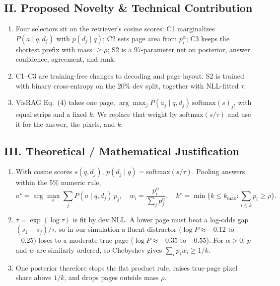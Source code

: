 \documentclass[8pt,a4paper]{article}
\begin{document}
\subsection*{II. Proposed Novelty \& Technical Contribution}
\begin{enumerate}
    \item Four selectors sit on the retriever's cosine scores: C1 marginalizes $P(a\mid q,d_j)$ with $p(d_j\mid q)$; C2 sets page area from $p_i^{\alpha}$; C3 keeps the shortest prefix with mass $\ge\rho$; S2 is a 97-parameter net on posterior, answer confidence, agreement, and rank.
    \item C1--C3 are training-free changes to decoding and page layout. S2 is trained with binary cross-entropy on the 20\% dev split, together with NLL-fitted $\tau$.
    \item VisRAG Eq.~(4) takes one page, $\arg\max_j P(a_j\mid q,d_j)\,\mathrm{softmax}(s)_j$, with equal strips and a fixed $k$. We replace that weight by $\mathrm{softmax}(s/\tau)$ and use it for the answer, the pixels, and $k$.
\end{enumerate}

\subsection*{III. Theoretical / Mathematical Justification}
\begin{enumerate}
    \item With cosine scores $s(q,d_j)$, $p(d_j\mid q)=\mathrm{softmax}(s/\tau)$. Pooling answers within the 5\% numeric rule,
    \[
        a^{\star}=\arg\max_a\sum_j P(a\mid q,d_j)\,p_j,\quad
        w_i=\frac{p_i^{\alpha}}{\sum_j p_j^{\alpha}},\quad
        k^{\star}=\min\{k\le k_{\max}:\textstyle\sum_{i\le k}p_i\ge\rho\}.
    \]
    \item $\tau=\exp(\log\tau)$ is fit by dev NLL. A lower page must beat a log-odds gap $(s_1-s_j)/\tau$, so in our simulation a fluent distractor ($\log P\approx-0.12$ to $-0.25$) loses to a moderate true page ($\log P\approx-0.35$ to $-0.55$). For $\alpha>0$, $p$ and $w$ are similarly ordered, so Chebyshev gives $\sum_i p_i w_i\ge 1/k$.
    \item One posterior therefore stops the flat product rule, raises true-page pixel share above $1/k$, and drops pages outside mass $\rho$.
\end{enumerate}
\end{document}
